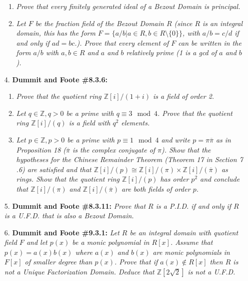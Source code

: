 \documentclass[12pt]{article}
\newcommand{\Z}{\mathbb{Z}}
\newcommand{\ba}{\overline}
\begin{document}
\begin{enumerate}
\begin{enumerate}
    \item \textit{Prove that every finitely generated ideal of a Bezout Domain is principal.}

    \item \textit{Let $F$ be the fraction field of the Bezout Domain $R$ \emph{(since $R$ is an integral domain, this has the form $F = \{a/b | a\in R, b\in R\setminus\{0\}\}$, with $a/b = c/d$ if and only if $ad = bc$.)}. Prove that every element of $F$ can be written in the form $a/b$ with $a, b\in R$ and $a$ and $b$ relatively prime (1 is a gcd of $a$ and $b$).}
\end{enumerate}

\newpage
\item[4.] \textbf{Dummit and Foote \#8.3.6: }

\begin{enumerate}
    \item \textit{Prove that the quotient ring $\Z[i]/(1 + i)$ is a field of order 2.}
    
    \item \textit{Let $q\in \Z, q>0$ be a prime with $q\equiv 3 \mod 4$. Prove that the quotient ring $\Z[i]/(q)$ is a field with $q^2$ elements.}
    
    \item \textit{Let $p\in\Z, p>0$ be a prime with $p\equiv 1 \mod 4$ and write $p = \pi\ba{\pi}$  as in Proposition 18 ($\ba{\pi}$ is the complex conjugate of $\pi$). Show that the hypotheses for the Chinese Remainder Theorem (Theorem 17 in Section 7 .6) are satisfied and that $\Z[i]/(p)\cong \Z[i]/(\pi)\times \Z[i]/(\ba{\pi})$ as rings. Show that the quotient ring $\Z[i]/(p)$ has order $p^2$ and conclude that $\Z[i]/(\pi)$ and $\Z[i]/(\ba{\pi})$ are both fields of order $p$.}
\end{enumerate}

\item[5.] \textbf{Dummit and Foote \#8.3.11:} \textit{Prove that $R$ is a P.I.D. if and only if $R$ is a U.F.D. that is also a Bezout Domain.}

\item[6.] \textbf{Dummit and Foote \#9.3.1:} \textit{Let $R$ be an integral domain with quotient field $F$ and let $p(x)$ be a monic polynomial in $R[x]$. Assume that $p(x) = a(x)b(x)$ where $a (x)$ and $b(x)$ are monic polynomials in $F[x]$ of smaller degree than $p(x)$. Prove that if $a(x)\notin R[x]$ then $R$ is not a Unique Factorization Domain. Deduce that $\Z[2\sqrt{2}]$ is not a U.F.D.}

\end{enumerate}
\end{document}
